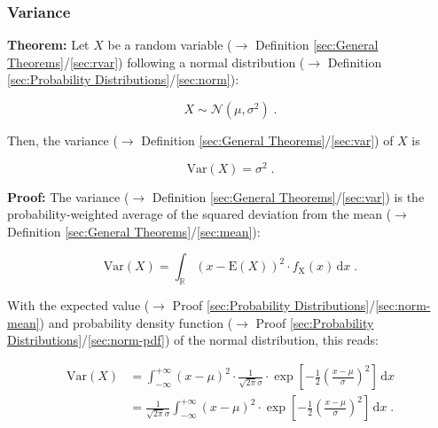 \documentclass[a4paper,12pt,twoside]{book}
\begin{document}
\subsubsection[\textbf{Variance}]{Variance} \label{sec:norm-var}
\setcounter{equation}{0}

\textbf{Theorem:} Let $X$ be a random variable ($\rightarrow$ Definition \ref{sec:General Theorems}/\ref{sec:rvar}) following a normal distribution ($\rightarrow$ Definition \ref{sec:Probability Distributions}/\ref{sec:norm}):

\begin{equation} \label{eq:norm-var-norm}
X \sim \mathcal{N}(\mu, \sigma^2) \; .
\end{equation}

Then, the variance ($\rightarrow$ Definition \ref{sec:General Theorems}/\ref{sec:var}) of $X$ is

\begin{equation} \label{eq:norm-var-norm-var}
\mathrm{Var}(X) = \sigma^2 \; .
\end{equation}


\vspace{1em}
\textbf{Proof:} The variance ($\rightarrow$ Definition \ref{sec:General Theorems}/\ref{sec:var}) is the probability-weighted average of the squared deviation from the mean ($\rightarrow$ Definition \ref{sec:General Theorems}/\ref{sec:mean}):

\begin{equation} \label{eq:norm-var-var}
\mathrm{Var}(X) = \int_{\mathbb{R}} (x - \mathrm{E}(X))^2 \cdot f_\mathrm{X}(x) \, \mathrm{d}x \; .
\end{equation}

With the expected value ($\rightarrow$ Proof \ref{sec:Probability Distributions}/\ref{sec:norm-mean}) and probability density function ($\rightarrow$ Proof \ref{sec:Probability Distributions}/\ref{sec:norm-pdf}) of the normal distribution, this reads:

\begin{equation} \label{eq:norm-var-norm-var-s1}
\begin{split}
\mathrm{Var}(X) &= \int_{-\infty}^{+\infty} (x - \mu)^2 \cdot \frac{1}{\sqrt{2 \pi} \sigma} \cdot \exp \left[ -\frac{1}{2} \left( \frac{x-\mu}{\sigma} \right)^2 \right] \, \mathrm{d}x \\
&= \frac{1}{\sqrt{2 \pi} \sigma} \int_{-\infty}^{+\infty} (x - \mu)^2 \cdot \exp \left[ -\frac{1}{2} \left( \frac{x-\mu}{\sigma} \right)^2 \right] \, \mathrm{d}x \; .
\end{split}
\end{equation}
\end{document}

